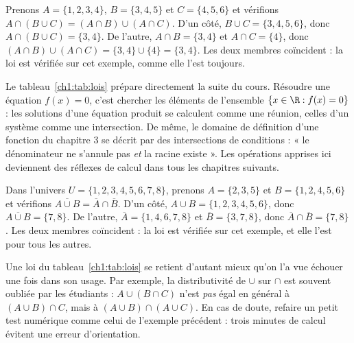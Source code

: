 \begin{exemple}
Prenons $A = \{1, 2, 3, 4\}$, $B = \{3, 4, 5\}$ et $C = \{4, 5, 6\}$ et vérifions $A \cap (B \cup C) = (A \cap B) \cup (A \cap C)$. D'un côté, $B \cup C = \{3, 4, 5, 6\}$, donc $A \cap (B \cup C) = \{3, 4\}$. De l'autre, $A \cap B = \{3, 4\}$ et $A \cap C = \{4\}$, donc $(A \cap B) \cup (A \cap C) = \{3, 4\} \cup \{4\} = \{3, 4\}$. Les deux membres coïncident : la loi est vérifiée sur cet exemple, comme elle l'est toujours.
\end{exemple}

\begin{remarque}
Le tableau~\ref{ch1:tab:lois} prépare directement la suite du cours. Résoudre une équation $f(x) = 0$, c'est chercher les éléments de l'ensemble $\{x \in \R : f(x) = 0\}$ : les solutions d'une équation produit se calculent comme une réunion, celles d'un système comme une intersection. De même, le domaine de définition d'une fonction du chapitre 3 se décrit par des intersections de conditions : « le dénominateur ne s'annule pas \emph{et} la racine existe ». Les opérations apprises ici deviennent des réflexes de calcul dans tous les chapitres suivants.
\end{remarque}

\begin{exemple}
Dans l'univers $U = \{1, 2, 3, 4, 5, 6, 7, 8\}$, prenons $A = \{2, 3, 5\}$ et $B = \{1, 2, 4, 5, 6\}$ et vérifions $\overline{A \cup B} = \overline{A} \cap \overline{B}$. D'un côté, $A \cup B = \{1, 2, 3, 4, 5, 6\}$, donc $\overline{A \cup B} = \{7, 8\}$. De l'autre, $\overline{A} = \{1, 4, 6, 7, 8\}$ et $\overline{B} = \{3, 7, 8\}$, donc $\overline{A} \cap \overline{B} = \{7, 8\}$. Les deux membres coïncident : la loi est vérifiée sur cet exemple, et elle l'est pour tous les autres.
\end{exemple}

\begin{remarque}
Une loi du tableau~\ref{ch1:tab:lois} se retient d'autant mieux qu'on l'a vue échouer une fois dans son usage. Par exemple, la distributivité de $\cup$ sur $\cap$ est souvent oubliée par les étudiants : $A \cup (B \cap C)$ n'est \emph{pas} égal en général à $(A \cup B) \cap C$, mais à $(A \cup B) \cap (A \cup C)$. En cas de doute, refaire un petit test numérique comme celui de l'exemple précédent : trois minutes de calcul évitent une erreur d'orientation.
\end{remarque}

